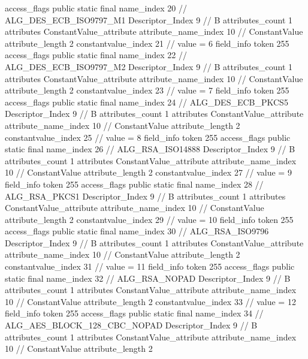 {{{{{				access_flags	public static final
				name_index	20		// ALG_DES_ECB_ISO9797_M1
				Descriptor_Index	9		// B
				attributes_count	1
				attributes {
				ConstantValue_attribute {
					attribute_name_index	10		// ConstantValue
					attribute_length	2
					constantvalue_index	21		// value = 6
				}
				}
			}
			field_info {
				token	255
				access_flags	public static final
				name_index	22		// ALG_DES_ECB_ISO9797_M2
				Descriptor_Index	9		// B
				attributes_count	1
				attributes {
				ConstantValue_attribute {
					attribute_name_index	10		// ConstantValue
					attribute_length	2
					constantvalue_index	23		// value = 7
				}
				}
			}
			field_info {
				token	255
				access_flags	public static final
				name_index	24		// ALG_DES_ECB_PKCS5
				Descriptor_Index	9		// B
				attributes_count	1
				attributes {
				ConstantValue_attribute {
					attribute_name_index	10		// ConstantValue
					attribute_length	2
					constantvalue_index	25		// value = 8
				}
				}
			}
			field_info {
				token	255
				access_flags	public static final
				name_index	26		// ALG_RSA_ISO14888
				Descriptor_Index	9		// B
				attributes_count	1
				attributes {
				ConstantValue_attribute {
					attribute_name_index	10		// ConstantValue
					attribute_length	2
					constantvalue_index	27		// value = 9
				}
				}
			}
			field_info {
				token	255
				access_flags	public static final
				name_index	28		// ALG_RSA_PKCS1
				Descriptor_Index	9		// B
				attributes_count	1
				attributes {
				ConstantValue_attribute {
					attribute_name_index	10		// ConstantValue
					attribute_length	2
					constantvalue_index	29		// value = 10
				}
				}
			}
			field_info {
				token	255
				access_flags	public static final
				name_index	30		// ALG_RSA_ISO9796
				Descriptor_Index	9		// B
				attributes_count	1
				attributes {
				ConstantValue_attribute {
					attribute_name_index	10		// ConstantValue
					attribute_length	2
					constantvalue_index	31		// value = 11
				}
				}
			}
			field_info {
				token	255
				access_flags	public static final
				name_index	32		// ALG_RSA_NOPAD
				Descriptor_Index	9		// B
				attributes_count	1
				attributes {
				ConstantValue_attribute {
					attribute_name_index	10		// ConstantValue
					attribute_length	2
					constantvalue_index	33		// value = 12
				}
				}
			}
			field_info {
				token	255
				access_flags	public static final
				name_index	34		// ALG_AES_BLOCK_128_CBC_NOPAD
				Descriptor_Index	9		// B
				attributes_count	1
				attributes {
				ConstantValue_attribute {
					attribute_name_index	10		// ConstantValue
					attribute_length	2
}}}}}}}
